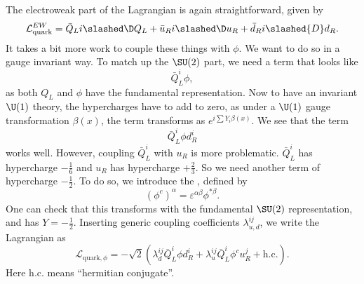 \documentclass[a4paper]{article}
\begin{document}
The electroweak part of the Lagrangian is again straightforward, given by
\[
  \mathcal{L}_{\mathrm{quark}}^{EW} = \bar{Q}_L i \slashed \D Q_L + \bar{u}_R i \slashed\D u_R + \bar{d}_R i \slashed{D} d_R.
\]
It takes a bit more work to couple these things with $\phi$. We want to do so in a gauge invariant way. To match up the $\SU(2)$ part, we need a term that looks like
\[
  \bar{Q}_L^i \phi,
\]
as both $Q_L$ and $\phi$ have the fundamental representation. Now to have an invariant $\U(1)$ theory, the hypercharges have to add to zero, as under a $\U(1)$ gauge transformation $\beta(x)$, the term transforms as $e^{i\sum Y_i \beta(x) }$. We see that the term
\[
  \bar{Q}_L^i \phi d_R^i
\]
works well. However, coupling $\bar{Q}_L^i$ with $u_R$ is more problematic. $\bar{Q}_L^i$ has hypercharge $-\frac{1}{6}$ and $u_R$ has hypercharge $+\frac{2}{3}$. So we need another term of hypercharge $-\frac{1}{2}$. To do so, we introduce the , defined by
\[
  (\phi^c)^\alpha = \varepsilon^{\alpha\beta} \phi^{* \beta}.
\]
One can check that this transforms with the fundamental $\SU(2)$ representation, and has $Y = -\frac{1}{2}$. Inserting generic coupling coefficients $\lambda_{u, d}^{ij}$, we write the Lagrangian as
\[
  \mathcal{L}_{\mathrm{quark}, \phi} = - \sqrt{2} (\lambda_d^{ij} \bar{Q}_L^i \phi d_R^i + \lambda_u^{ij} \bar{Q}_L^i \phi^c u_R^j + \mathrm{h.c.}).
\]
Here $\text{h.c.}$ means ``hermitian conjugate''.
\end{document}
